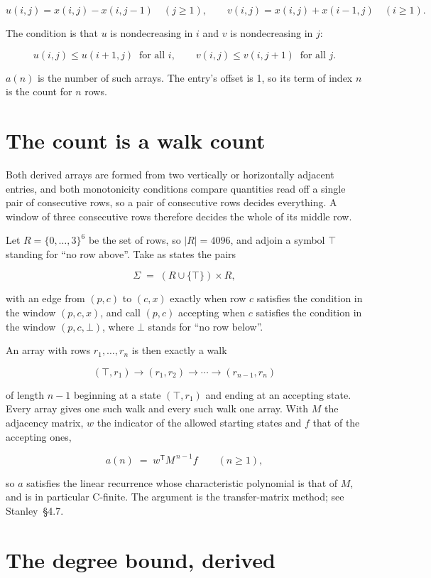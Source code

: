 \documentclass[11pt]{article}
\theoremstyle{definition}
\begin{document}
\[u(i,j) = x(i,j) - x(i,j{-}1)\quad (j \ge 1), \qquad v(i,j) = x(i,j) + x(i{-}1,j)\quad (i \ge 1).\]

The condition is that $u$ is nondecreasing in $i$ and $v$ is nondecreasing in $j$:

\[u(i,j) \le u(i{+}1,j) \ \text{ for all } i, \qquad v(i,j) \le v(i,j{+}1) \ \text{ for all } j.\]

$a(n)$ is the number of such arrays. The entry's offset is 1, so its term of index $n$ is the count for $n$ rows.

\section{The count is a walk count}

Both derived arrays are formed from two vertically or horizontally adjacent entries, and both monotonicity conditions compare quantities read off a single pair of consecutive rows, so a pair of consecutive rows decides everything. A window of three consecutive rows therefore decides the whole of its middle row.

Let $R = \{0,\dots,3\}^{6}$ be the set of rows, so $|R| = 4096$, and adjoin a symbol $\top$ standing for ``no row above''. Take as states the pairs

\[\Sigma \;=\; (R \cup \{\top\}) \times R,\]

with an edge from $(p,c)$ to $(c,x)$ exactly when row $c$ satisfies the condition in the window $(p,c,x)$, and call $(p,c)$ accepting when $c$ satisfies the condition in the window $(p,c,\bot)$, where $\bot$ stands for ``no row below''.

An array with rows $r_1,\dots,r_n$ is then exactly a walk

\[(\top,r_1) \to (r_1,r_2) \to \cdots \to (r_{n-1},r_n)\]

of length $n-1$ beginning at a state $(\top,r_1)$ and ending at an accepting state. Every array gives one such walk and every such walk one array. With $M$ the adjacency matrix, $w$ the indicator of the allowed starting states and $f$ that of the accepting ones,

\[a(n) \;=\; w^{\mathsf T} M^{\,n-1} f \qquad (n \ge 1),\]

so $a$ satisfies the linear recurrence whose characteristic polynomial is that of $M$, and is in particular C-finite. The argument is the transfer-matrix method; see Stanley~\S4.7.

\section{The degree bound, derived}
\end{document}
